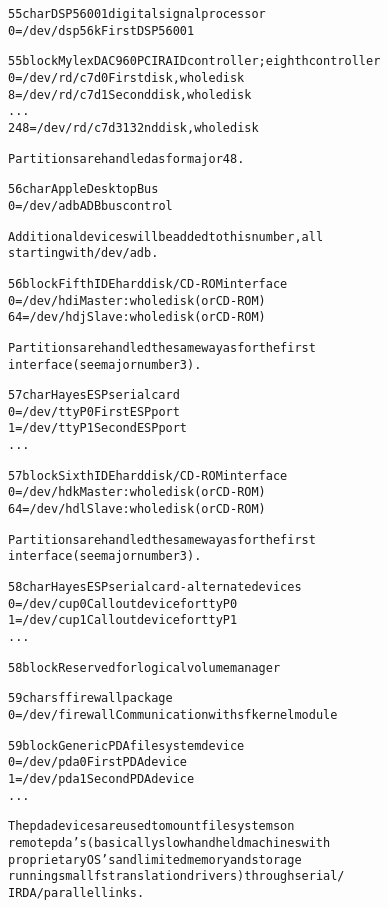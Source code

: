 \documentclass[a4paper,8pt,english]{sphinxmanual}
\begin{document}
\begin{alltt}
  55 char       DSP56001 digital signal processor
                  0 = /dev/dsp56k       First DSP56001

  55 block      Mylex DAC960 PCI RAID controller; eighth controller
                  0 = /dev/rd/c7d0      First disk, whole disk
                  8 = /dev/rd/c7d1      Second disk, whole disk
                    ...
                248 = /dev/rd/c7d31     32nd disk, whole disk

                Partitions are handled as for major 48.

  56 char       Apple Desktop Bus
                  0 = /dev/adb          ADB bus control

                Additional devices will be added to this number, all
                starting with /dev/adb.

  56 block      Fifth IDE hard disk/CD-ROM interface
                  0 = /dev/hdi          Master: whole disk (or CD-ROM)
                 64 = /dev/hdj          Slave: whole disk (or CD-ROM)

                Partitions are handled the same way as for the first
                interface (see major number 3).

  57 char       Hayes ESP serial card
                  0 = /dev/ttyP0        First ESP port
                  1 = /dev/ttyP1        Second ESP port
                    ...

  57 block      Sixth IDE hard disk/CD-ROM interface
                  0 = /dev/hdk          Master: whole disk (or CD-ROM)
                 64 = /dev/hdl          Slave: whole disk (or CD-ROM)

                Partitions are handled the same way as for the first
                interface (see major number 3).

  58 char       Hayes ESP serial card - alternate devices
                  0 = /dev/cup0         Callout device for ttyP0
                  1 = /dev/cup1         Callout device for ttyP1
                    ...

  58 block      Reserved for logical volume manager

  59 char       sf firewall package
                  0 = /dev/firewall     Communication with sf kernel module

  59 block      Generic PDA filesystem device
                  0 = /dev/pda0         First PDA device
                  1 = /dev/pda1         Second PDA device
                    ...

                The pda devices are used to mount filesystems on
                remote pda's (basically slow handheld machines with
                proprietary OS's and limited memory and storage
                running small fs translation drivers) through serial /
                IRDA / parallel links.


\end{alltt}
\end{document}
